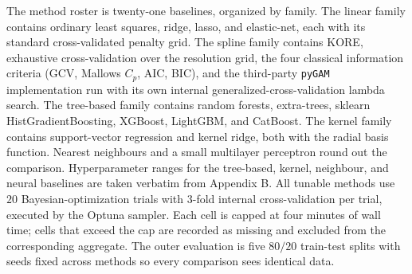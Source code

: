 \documentclass{article}
\newcommand{\KORE}{\textsc{KORE}}
\begin{document}
The method roster is twenty-one baselines, organized by family. The linear family contains ordinary least squares, ridge, lasso, and elastic-net, each with its standard cross-validated penalty grid. The spline family contains \KORE{}, exhaustive cross-validation over the resolution grid, the four classical information criteria (GCV, Mallows $C_p$, AIC, BIC), and the third-party \texttt{pyGAM} implementation \citep{serven2018pygam} run with its own internal generalized-cross-validation lambda search. The tree-based family contains random forests, extra-trees, sklearn HistGradientBoosting, XGBoost, LightGBM, and CatBoost. The kernel family contains support-vector regression and kernel ridge, both with the radial basis function. Nearest neighbours and a small multilayer perceptron round out the comparison. Hyperparameter ranges for the tree-based, kernel, neighbour, and neural baselines are taken verbatim from \citet{grinsztajn2022tree} Appendix B. All tunable methods use $20$ Bayesian-optimization trials with $3$-fold internal cross-validation per trial, executed by the Optuna sampler. Each cell is capped at four minutes of wall time; cells that exceed the cap are recorded as missing and excluded from the corresponding aggregate. The outer evaluation is five $80/20$ train-test splits with seeds fixed across methods so every comparison sees identical data.
\end{document}
